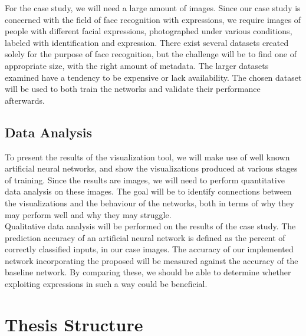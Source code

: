 \noindent For the case study, we will need a large amount of images. Since our case study is concerned with the field of face recognition with expressions, we require images of people with different facial expressions, photographed under various conditions, labeled with identification and expression. There exist several datasets created solely for the purpose of face recognition, but the challenge will be to find one of appropriate size, with the right amount of metadata. The larger datasets examined have a tendency to be expensive or lack availability. The chosen dataset will be used to both train the networks and validate their performance afterwards.

\subsection{Data Analysis}

To present the results of the visualization tool, we will make use of well known artificial neural networks, and show the visualizations produced at various stages of training. Since the results are images, we will need to perform quantitative data analysis on these images. The goal will be to identify connections between the visualizations and the behaviour of the networks, both in terms of why they may perform well and why they may struggle. \\

\noindent Qualitative data analysis will be performed on the results of the case study. The prediction accuracy of an artificial neural network is defined as the percent of correctly classified inputs, in our case images. The accuracy of our implemented network incorporating the proposed will be measured against the accuracy of the baseline network. By comparing these, we should be able to determine whether exploiting expressions in such a way could be beneficial.

\section{Thesis Structure}


